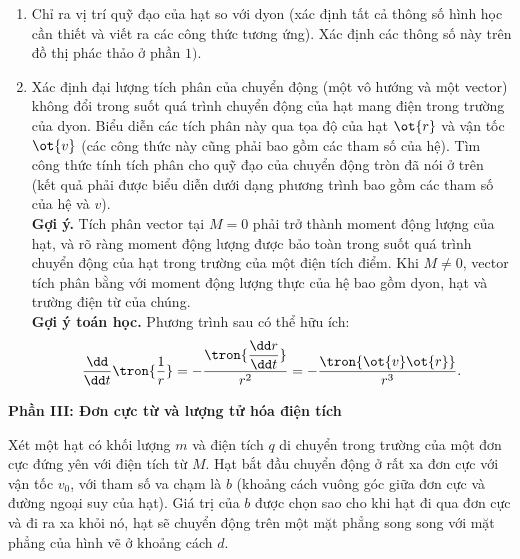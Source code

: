 \begin{vd}
\begin{enumerate}[1)]
        \item Chỉ ra vị trí quỹ đạo của hạt so với dyon (xác định tất cả thông số hình học cần thiết và viết ra các công thức tương ứng). Xác định các thông số này trên đồ thị phác thảo ở phần $1)$.
        \item Xác định đại lượng tích phân của chuyển động (một vô hướng và một vector) không đổi trong suốt quá trình chuyển động của hạt mang điện trong trường của dyon. Biểu diễn các tích phân này qua tọa độ của hạt $\ot{r}$ và vận tốc $\ot{v}$ (các công thức này cũng phải bao gồm các tham số của hệ). Tìm công thức tính tích phân cho quỹ đạo của chuyển động tròn đã nói ở trên (kết quả phải được biểu diễn dưới dạng phương trình bao gồm các tham số của hệ và $v$).\\
        \textbf{Gợi ý.} Tích phân vector tại $M=0$ phải trở thành moment động lượng của hạt, và rõ ràng moment động lượng được bảo toàn trong suốt quá trình chuyển động của hạt trong trường của một điện tích điểm. Khi $M\ne 0$, vector tích phân bằng với moment động lượng thực của hệ bao gồm dyon, hạt và trường điện từ của chúng.\\
        \textbf{Gợi ý toán học.} Phương trình sau có thể hữu ích:
        $$\dfrac{\dd}{\dd t}\tron{\dfrac{1}{r}}=-\dfrac{\tron{\dfrac{\dd r}{\dd t}}}{r^2}=-\dfrac{\tron{\ot{v}\ot{r}}}{r^3}.$$
    \end{enumerate}
\begin{center}
    \textbf{Phần III: Đơn cực từ và lượng tử hóa điện tích}
    \end{center}
Xét một hạt có khối lượng $m$ và điện tích $q$ di chuyển trong trường của một đơn cực đứng yên với điện tích từ $M$. Hạt bắt đầu chuyển động ở rất xa đơn cực với vận tốc $v_0$, với tham số va chạm là $b$ (khoảng cách vuông góc giữa đơn cực và đường ngoại suy của hạt). Giá trị của $b$ được chọn sao cho khi hạt đi qua đơn cực và đi ra xa khỏi nó, hạt sẽ chuyển động trên một mặt phẳng song song với mặt phẳng của hình vẽ ở khoảng cách $d$.
\begin{center}

\begin{tikzpicture}[x=0.75pt,y=0.75pt,yscale=-1,xscale=1]


\end{tikzpicture}
\end{center}
\end{vd}
